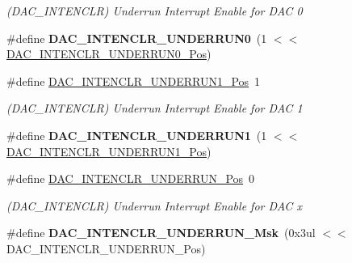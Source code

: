 \begin{DoxyCompactItemize}
\begin{DoxyCompactList}\small\item\em (D\+A\+C\+\_\+\+I\+N\+T\+E\+N\+C\+L\+R) Underrun Interrupt Enable for D\+A\+C 0 \end{DoxyCompactList}\item 
\hypertarget{group___s_a_m_l21___d_a_c_gab26a91de109d45f13cb1a09a697ef2d6}{}\#define {\bfseries D\+A\+C\+\_\+\+I\+N\+T\+E\+N\+C\+L\+R\+\_\+\+U\+N\+D\+E\+R\+R\+U\+N0}~(1 $<$$<$ \hyperlink{group___s_a_m_l21___d_a_c_gaf014e05835054e1c9f63e9a4cf8ff275}{D\+A\+C\+\_\+\+I\+N\+T\+E\+N\+C\+L\+R\+\_\+\+U\+N\+D\+E\+R\+R\+U\+N0\+\_\+\+Pos})\label{group___s_a_m_l21___d_a_c_gab26a91de109d45f13cb1a09a697ef2d6}

\item 
\hypertarget{group___s_a_m_l21___d_a_c_ga7cf06d6965801dd4129c2951435cf4cc}{}\#define \hyperlink{group___s_a_m_l21___d_a_c_ga7cf06d6965801dd4129c2951435cf4cc}{D\+A\+C\+\_\+\+I\+N\+T\+E\+N\+C\+L\+R\+\_\+\+U\+N\+D\+E\+R\+R\+U\+N1\+\_\+\+Pos}~1\label{group___s_a_m_l21___d_a_c_ga7cf06d6965801dd4129c2951435cf4cc}

\begin{DoxyCompactList}\small\item\em (D\+A\+C\+\_\+\+I\+N\+T\+E\+N\+C\+L\+R) Underrun Interrupt Enable for D\+A\+C 1 \end{DoxyCompactList}\item 
\hypertarget{group___s_a_m_l21___d_a_c_gaaa2eb25d29830511584d2206d3dd0cf3}{}\#define {\bfseries D\+A\+C\+\_\+\+I\+N\+T\+E\+N\+C\+L\+R\+\_\+\+U\+N\+D\+E\+R\+R\+U\+N1}~(1 $<$$<$ \hyperlink{group___s_a_m_l21___d_a_c_ga7cf06d6965801dd4129c2951435cf4cc}{D\+A\+C\+\_\+\+I\+N\+T\+E\+N\+C\+L\+R\+\_\+\+U\+N\+D\+E\+R\+R\+U\+N1\+\_\+\+Pos})\label{group___s_a_m_l21___d_a_c_gaaa2eb25d29830511584d2206d3dd0cf3}

\item 
\hypertarget{group___s_a_m_l21___d_a_c_ga1a17f5ec1b6b1d51eb7caa0e41fd01f8}{}\#define \hyperlink{group___s_a_m_l21___d_a_c_ga1a17f5ec1b6b1d51eb7caa0e41fd01f8}{D\+A\+C\+\_\+\+I\+N\+T\+E\+N\+C\+L\+R\+\_\+\+U\+N\+D\+E\+R\+R\+U\+N\+\_\+\+Pos}~0\label{group___s_a_m_l21___d_a_c_ga1a17f5ec1b6b1d51eb7caa0e41fd01f8}

\begin{DoxyCompactList}\small\item\em (D\+A\+C\+\_\+\+I\+N\+T\+E\+N\+C\+L\+R) Underrun Interrupt Enable for D\+A\+C x \end{DoxyCompactList}\item 
\hypertarget{group___s_a_m_l21___d_a_c_ga7180d3cd0ea848af08e9029f18cd86c3}{}\#define {\bfseries D\+A\+C\+\_\+\+I\+N\+T\+E\+N\+C\+L\+R\+\_\+\+U\+N\+D\+E\+R\+R\+U\+N\+\_\+\+Msk}~(0x3ul $<$$<$ D\+A\+C\+\_\+\+I\+N\+T\+E\+N\+C\+L\+R\+\_\+\+U\+N\+D\+E\+R\+R\+U\+N\+\_\+\+Pos)\label{group___s_a_m_l21___d_a_c_ga7180d3cd0ea848af08e9029f18cd86c3}


\end{DoxyCompactItemize}
